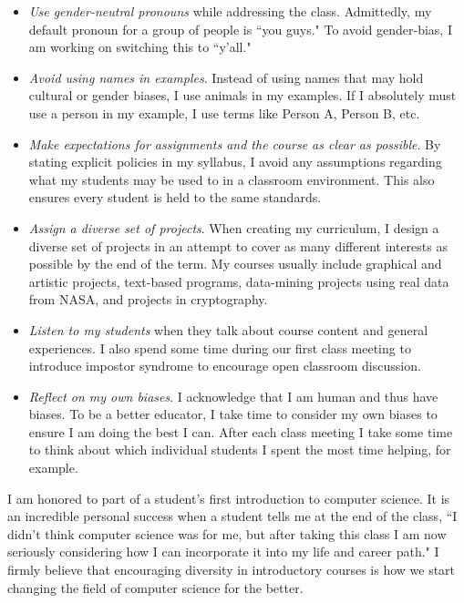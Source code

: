 \documentclass[12pt]{amsart} \usepackage{amssymb}
\begin{document}
\begin{itemize}
\item \emph{Use gender-neutral pronouns} while addressing the class. Admittedly, my default pronoun for a group of people is ``you guys." To avoid gender-bias, I am working on switching this to ``y'all."  \vspace{2mm}
\item \emph{Avoid using names in examples}. Instead of using names that may hold cultural or gender biases, I use animals in my examples. If I absolutely must use a person in my example, I use terms like Person A, Person B, etc.
\vspace{2mm}
\item \emph{Make expectations for assignments and the course as clear as possible}. By stating explicit policies in my syllabus, I avoid any assumptions regarding what my students may be used to in a classroom environment. This also ensures every student is held to the same standards.
\vspace{2mm}
\item \emph{Assign a diverse set of projects}. When creating my curriculum, I design a diverse set of projects in an attempt to cover as many different interests as possible by the end of the term. My courses usually include graphical and artistic projects, text-based programs, data-mining projects using real data from NASA, and projects in cryptography.
\vspace{2mm}
\item \emph{Listen to my students} when they talk about course content and general experiences. I also spend some time during our first class meeting to introduce impostor syndrome to encourage open classroom discussion.
\vspace{2mm}
\item \emph{Reflect on my own biases}. I acknowledge that I am human and thus have biases. To be a better educator, I take time to consider my own biases to ensure I am doing the best I can. After each class meeting I take some time to think about which individual students I spent the most time helping, for example.
\end{itemize}

I am honored to part of a student's first introduction to computer science. It is an incredible personal success when a student tells me at the end of the class, ``I didn't think computer science was for me, but after taking this class I am now seriously considering how I can incorporate it into my life and career path." I firmly believe that encouraging diversity in introductory courses is how we start changing the field of computer science for the better.
\end{document}
